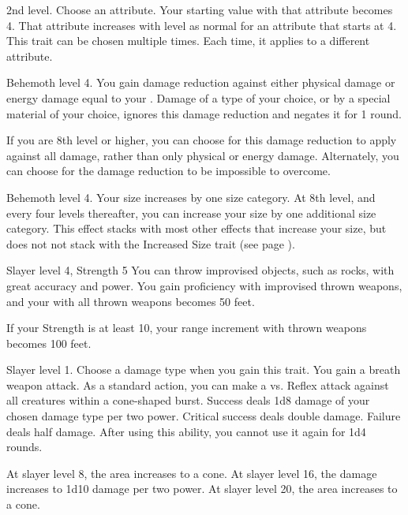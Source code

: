     \featpre 2nd level.
    \featben Choose an attribute.
    Your starting value with that attribute becomes 4.
    That attribute increases with level as normal for an attribute that starts at 4.
     This trait can be chosen multiple times.
    Each time, it applies to a different attribute.

    \featpre Behemoth level 4.
    \featben You gain damage reduction against either physical damage or energy damage equal to your .
    Damage of a type of your choice, or by a special material of your choice, ignores this damage reduction and negates it for 1 round.

    If you are 8th level or higher, you can choose for this damage reduction to apply against all damage, rather than only physical or energy damage.
    Alternately, you can choose for the damage reduction to be impossible to overcome.

    \featpre Behemoth level 4.
    \featben Your size increases by one size category.
    At 8th level, and every four levels thereafter, you can increase your size by one additional size category.
    This effect stacks with most other effects that increase your size, but does not not stack with the Increased Size trait (see page ).

    \featpre Slayer level 4, Strength 5
    \featben You can throw improvised objects, such as rocks, with great accuracy and power.
    You gain proficiency with improvised thrown weapons, and your  with all thrown weapons becomes 50 feet.

    If your Strength is at least 10, your range increment with thrown weapons becomes 100 feet.

    \featpre Slayer level 1.
     Choose a damage type when you gain this trait.
    \featben You gain a breath weapon attack.
    As a standard action, you can make a  vs. Reflex attack against all creatures within a \areamed cone-shaped burst.
    Success deals 1d8 damage of your chosen damage type per two power.
    Critical success deals double damage.
    Failure deals half damage.
    After using this ability, you cannot use it again for 1d4 rounds.

    At slayer level 8, the area increases to a \arealarge cone.
    At slayer level 16, the damage increases to 1d10 damage per two power.
    At slayer level 20, the area increases to a \areahuge cone.

